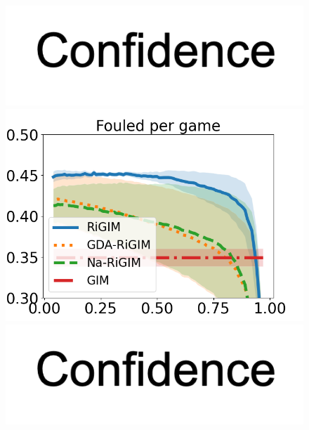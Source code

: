 \documentclass{article}
\begin{document}
\begin{figure}[htbp]
\begin{minipage}{0.16\textwidth}
    \vspace{-0.05in}
    \includegraphics[scale=0.12]{figures/confidence_x_label.png}
    \end{minipage}
    \begin{minipage}{0.16\textwidth}
    \centering
    \includegraphics[scale=0.14]{figures/soccer_risk_curve_Fouled_shadow.png}\par
    \vspace{-0.05in}
    \includegraphics[scale=0.12]{figures/confidence_x_label.png}
    \end{minipage}
    \begin{minipage}{0.16\textwidth}
    \centering

\end{minipage}
\end{figure}
\end{document}

